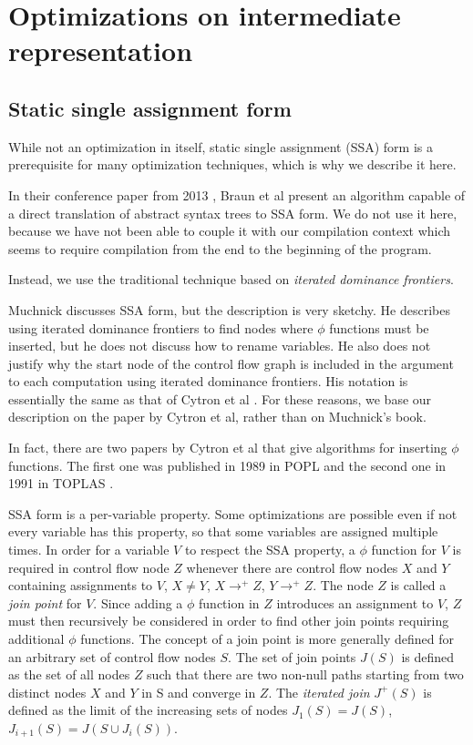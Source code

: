 \chapter{Optimizations on intermediate representation}

\section{Static single assignment form}
\label{mir-optimizations-ssa-form}

While not an optimization in itself, static single assignment (SSA)
form is a prerequisite for many optimization techniques, which is why
we describe it here. 

In their conference paper from 2013
\cite{Braun:2013:SEC:2450247.2450258}, Braun et al present an
algorithm capable of a direct translation of abstract syntax trees to
SSA form.  We do not use it here, because we have not been able to
couple it with our compilation context which seems to require
compilation from the end to the beginning of the program. 

Instead, we use the traditional technique based on \emph{iterated
  dominance frontiers}.

Muchnick \cite{Muchnick:1998:ACD:286076} discusses SSA form, but the
description is very sketchy.  He describes using iterated dominance
frontiers to find nodes where $\phi$ functions must be inserted, but
he does not discuss how to rename variables.  He also does not justify
why the start node of the control flow graph is included in the
argument to each computation using iterated dominance frontiers.  His
notation is essentially the same as that of Cytron et al
\cite{Cytron:1991:ECS:115372.115320}.  For these reasons, we base our
description on the paper by Cytron et al, rather than on Muchnick's
book.

In fact, there are two papers by Cytron et al that give algorithms for
inserting $\phi$ functions.  The first one was published in 1989 in
POPL \cite{Cytron:1989:EMC:75277.75280} and the second one in 1991 in
TOPLAS \cite{Cytron:1991:ECS:115372.115320}.

SSA form is a per-variable property.  Some optimizations are possible
even if not every variable has this property, so that some variables
are assigned multiple times.  In order for a variable $V$ to respect
the SSA property, a $\phi$ function for $V$ is required in control
flow node $Z$ whenever there are control flow nodes $X$ and $Y$
containing assignments to $V$, $X \ne Y$, $X \rightarrow^+ Z$, $Y
\rightarrow^+ Z$.  The node $Z$ is called a \emph{join point} for $V$.
Since adding a $\phi$ function in $Z$ introduces an assignment to $V$,
$Z$ must then recursively be considered in order to find other join
points requiring additional $\phi$ functions.  The concept of a join
point is more generally defined for an arbitrary set of control flow
nodes $S$.  The set of join points $J(S)$ is defined as the set of all
nodes $Z$ such that there are two non-null paths starting from two
distinct nodes $X$ and $Y$ in S and converge in $Z$.  The
\emph{iterated join} $J^+(S)$ is defined as the limit of the
increasing sets of nodes $J_1(S) = J(S)$, $J_{i+1}(S) = J(S \cup
J_i(S))$.

